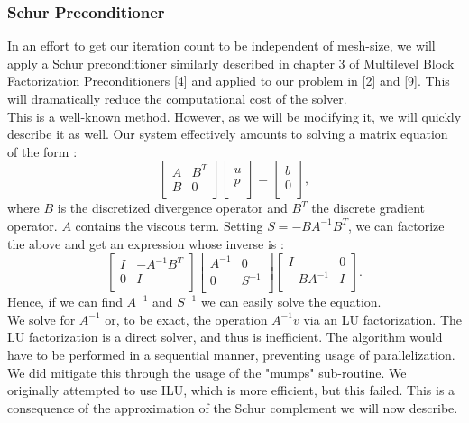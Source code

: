 \documentclass[11pt,twoside,a4paper]{article}
\begin{document}
\subsubsection{Schur Preconditioner}
In an effort to get our iteration count to be independent of mesh-size, we will apply a Schur preconditioner similarly described in chapter 3 of Multilevel Block Factorization Preconditioners [4] and applied to our problem in [2] and [9]. This will dramatically reduce the computational cost of the solver.\\
This is a well-known method. However, as we will be modifying it, we will quickly describe it as well.
Our system effectively amounts to solving a matrix equation of the form :
$$
\begin{bmatrix}
A         & B^{T}\\
B         & 0 \\
\end{bmatrix}
\begin{bmatrix}
u    \\
p     \\
\end{bmatrix}
=
\begin{bmatrix}
b    \\
0     \\
\end{bmatrix} ,
$$
where $B$ is the discretized divergence operator and $B^T$ the discrete gradient operator. $A$ contains the viscous term.
Setting $S = - B A^{-1} B^{T}$, we can factorize the above and get an expression whose inverse is :
$$
\begin{bmatrix}
I         & - A^{-1} B^{T}\\
0         & I \\
\end{bmatrix}
\begin{bmatrix}
A^{-1}   & 0\\
0       & S^{-1} \\
\end{bmatrix}
\begin{bmatrix}
I & 0\\
 - B A^{-1}       & I \\
\end{bmatrix} .
$$
Hence, if we can find $A^{-1}$ and $S^{-1}$ we can easily solve the equation.\\
We solve for $A^{-1}$ or, to be exact, the operation $A^{-1}v$ via an LU factorization. The LU factorization is a direct solver, and thus is inefficient. The algorithm would have to be performed in a sequential manner, preventing usage of parallelization. We did mitigate this through the usage of the "mumps" sub-routine. We originally attempted to use ILU, which is more efficient, but this failed. This is a consequence of the approximation of the Schur complement we will now describe.\\
\end{document}
